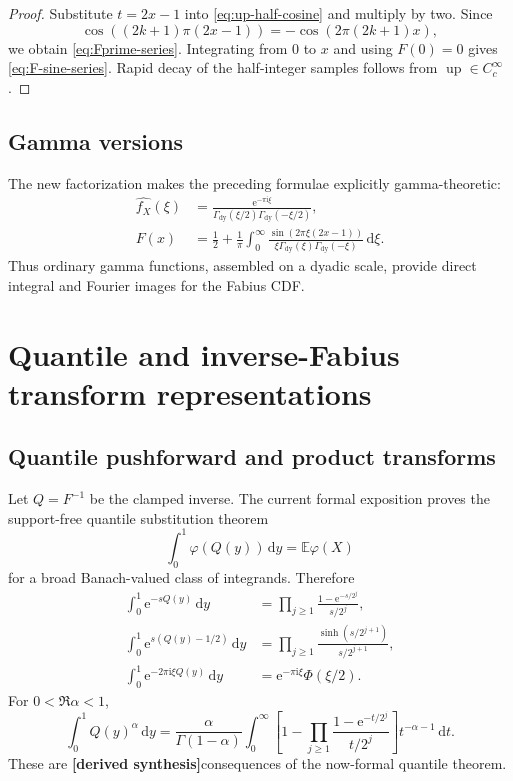 \documentclass[11pt,oneside]{article}
\theoremstyle{definition}
\theoremstyle{remark}
\newcommand{\E}{\mathbb E}
\newcommand{\Up}{\operatorname{up}}
\newcommand{\e}{\mathrm e}
\newcommand{\ii}{\mathrm i}
\newcommand{\dd}{\,\mathrm d}
\newcommand{\GammaDy}{\Gamma_{\!\mathrm{dy}}}
\newcommand{\Derived}{\textcolor{deepgreen}{\textbf{[derived synthesis]}}}
\begin{document}
\begin{proof}
Substitute $t=2x-1$ into \eqref{eq:up-half-cosine} and multiply by two.  Since
\[
 \cos((2k+1)\pi(2x-1))=-\cos(2\pi(2k+1)x),
\]
we obtain \eqref{eq:Fprime-series}.  Integrating from $0$ to $x$ and using $F(0)=0$ gives
\eqref{eq:F-sine-series}.  Rapid decay of the half-integer samples follows from
$\Up\in C_c^\infty$.
\end{proof}

\subsection{Gamma versions}

The new factorization makes the preceding formulae explicitly gamma-theoretic:
\begin{align}
 \widehat{f_X}(\xi)
 &=\frac{\e^{-\pi\ii\xi}}
 {\GammaDy(\xi/2)\GammaDy(-\xi/2)},                       \label{eq:fX-gamma}\\
 F(x)
 &=\frac12+\frac1\pi\int_0^\infty
 \frac{\sin(2\pi\xi(2x-1))}
 {\xi\GammaDy(\xi)\GammaDy(-\xi)}\dd\xi.              \label{eq:F-gamma-again}
\end{align}
Thus ordinary gamma functions, assembled on a dyadic scale, provide direct integral and
Fourier images for the Fabius CDF.

\section{Quantile and inverse-Fabius transform representations}
\label{sec:inverse-fourier}

\subsection{Quantile pushforward and product transforms}

Let $Q=F^{-1}$ be the clamped inverse.  The current formal exposition proves the support-free
quantile substitution theorem
\begin{equation}
 \int_0^1\varphi(Q(y))\dd y=\E\varphi(X)                 \label{eq:quantile-substitution}
\end{equation}
for a broad Banach-valued class of integrands.  Therefore
\begin{align}
 \int_0^1\e^{-sQ(y)}\dd y
 &=\prod_{j\ge1}\frac{1-\e^{-s/2^j}}{s/2^j},             \label{eq:Q-Laplace}\\
 \int_0^1\e^{s(Q(y)-1/2)}\dd y
 &=\prod_{j\ge1}\frac{\sinh(s/2^{j+1})}{s/2^{j+1}},     \label{eq:Q-centered-MGF}\\
 \int_0^1\e^{-2\pi\ii\xi Q(y)}\dd y
 &=\e^{-\pi\ii\xi}\Phi(\xi/2).                        \label{eq:Q-characteristic}
\end{align}
For $0<\Re\alpha<1$,
\begin{equation}
 \int_0^1Q(y)^\alpha\dd y
 =\frac{\alpha}{\Gamma(1-\alpha)}\int_0^\infty
 \left[1-\prod_{j\ge1}\frac{1-\e^{-t/2^j}}{t/2^j}\right]
 t^{-\alpha-1}\dd t.                                    \label{eq:Q-fractional-moment}
\end{equation}
These are \Derived consequences of the now-formal quantile theorem.
\end{document}
